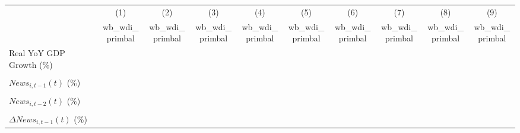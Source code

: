 {
\def\sym#1{\ifmmode^{#1}\else\(^{#1}\)\fi}
\begin{tabular}{l*{9}{c}}
\toprule
                    &\multicolumn{1}{c}{(1)}&\multicolumn{1}{c}{(2)}&\multicolumn{1}{c}{(3)}&\multicolumn{1}{c}{(4)}&\multicolumn{1}{c}{(5)}&\multicolumn{1}{c}{(6)}&\multicolumn{1}{c}{(7)}&\multicolumn{1}{c}{(8)}&\multicolumn{1}{c}{(9)}\\
                    &\multicolumn{1}{c}{wb_wdi_primbal}&\multicolumn{1}{c}{wb_wdi_primbal}&\multicolumn{1}{c}{wb_wdi_primbal}&\multicolumn{1}{c}{wb_wdi_primbal}&\multicolumn{1}{c}{wb_wdi_primbal}&\multicolumn{1}{c}{wb_wdi_primbal}&\multicolumn{1}{c}{wb_wdi_primbal}&\multicolumn{1}{c}{wb_wdi_primbal}&\multicolumn{1}{c}{wb_wdi_primbal}\\
\midrule
Real YoY GDP Growth (\%)&                     &                     &                     &                     &                     &                     &                     &                     &                     \\
                    &                     &                     &                     &                     &                     &                     &                     &                     &                     \\
\addlinespace
$ News_{i,t-1}(t)$ (\%)&                     &                     &                     &                     &                     &                     &                     &                     &                     \\
                    &                     &                     &                     &                     &                     &                     &                     &                     &                     \\
\addlinespace
$ News_{i,t-2}(t)$ (\%)&                     &                     &                     &                     &                     &                     &                     &                     &                     \\
                    &                     &                     &                     &                     &                     &                     &                     &                     &                     \\
\addlinespace
$ \Delta News_{i,t-1}(t)$ (\%)&                     &                     &                     &                     &                     &                     &                     &                     &                     \\

\end{tabular}}

